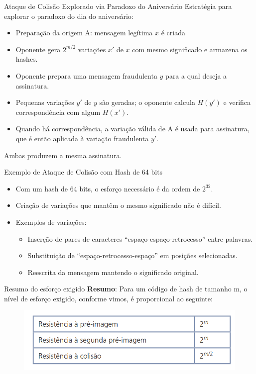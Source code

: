 \begin{frame}{Ataque de Colisão Explorado via Paradoxo do Aniversário}
    Estratégia para explorar o paradoxo do dia do aniversário:
    \begin{itemize}
        \item Preparação da origem A: mensagem legítima \(x\) é criada
        \item Oponente gera \(2^{m/2}\) variações \(x'\) de \(x\) com mesmo significado e armazena os hashes.
        \item Oponente prepara uma mensagem fraudulenta \(y\) para a qual deseja a assinatura.
        \item Pequenas variações \(y'\) de \(y\) são geradas; o oponente calcula \(H(y')\) e verifica correspondência com algum \(H(x')\).
        \item Quando há correspondência, a variação válida de A é usada para assinatura, que é então aplicada à variação fraudulenta \(y'\).
    \end{itemize}
    Ambas produzem a mesma assinatura.
\end{frame}
\begin{frame}{Exemplo de Ataque de Colisão com Hash de 64 bits}
    \begin{itemize}
        \item Com um hash de 64 bits, o esforço necessário é da ordem de \(2^{32}\).
        \item Criação de variações que mantêm o mesmo significado não é difícil.
        \item Exemplos de variações:
              \begin{itemize}
                  \item Inserção de pares de caracteres ``espaço-espaço-retrocesso'' entre palavras.
                  \item Substituição de ``espaço-retrocesso-espaço'' em posições selecionadas.
                  \item Reescrita da mensagem mantendo o significado original.
              \end{itemize}
    \end{itemize}
\end{frame}
\begin{frame}{Resumo do esforço exigido}
    \textbf{Resumo}: Para um código de hash de tamanho m, o nível de esforço exigido, conforme vimos, é proporcional ao seguinte:
    \begin{figure}
        \centering
        \includegraphics[width=0.7\linewidth]{Figuras/resumo-do-esforco-exigido.png}
    \end{figure}
\end{frame}

